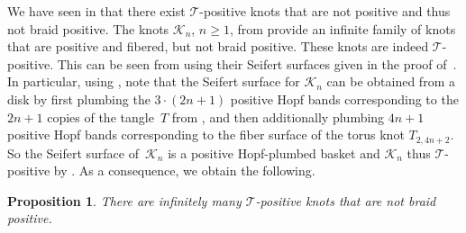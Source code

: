 \documentclass{amsart}
\theoremstyle{definition}
\theoremstyle{remark}
\theoremstyle{plain}
\newtheorem{theorem}[definition]{Theorem}%
\newtheorem{proposition}[definition]{Proposition}
\newcommand{\T}{\mathcal{T}}
\begin{document}
We have seen in  that there exist $\T$-positive knots that are not positive and thus not braid positive. The knots $\mathcal{K}_n$, $n \geq 1$, from \cite[Proposition~5.3]{kegel2024unknottingfiberedpositiveknots} provide an infinite family of knots that are positive and fibered, but not braid positive. These knots are indeed $\T$-positive. This can be seen from  using their Seifert surfaces given in the proof of~\cite[Proposition~5.3 (1)]{kegel2024unknottingfiberedpositiveknots}. In particular, using \cite[Figure~9]{kegel2024unknottingfiberedpositiveknots}, note that the Seifert surface for $\mathcal{K}_n$ can be obtained from a disk by first plumbing the $3 \cdot (2n+1)$ positive Hopf bands corresponding to the $2n+1$ copies of the tangle~$T$ from \cite[Figure~8]{kegel2024unknottingfiberedpositiveknots}, and then additionally plumbing $4n+1$ positive Hopf bands corresponding to the fiber surface of the torus knot $T_{2,4n+2}$. So the Seifert surface of~$\mathcal{K}_n$ is a positive Hopf-plumbed basket and $\mathcal{K}_n$ thus $\T$-positive by . As a consequence, we obtain the following.
\begin{proposition}%
\label{prop:inf_T-pos_not_bp}
    There are infinitely many $\T$-positive knots that are not braid positive.
\end{proposition}



\end{document}
